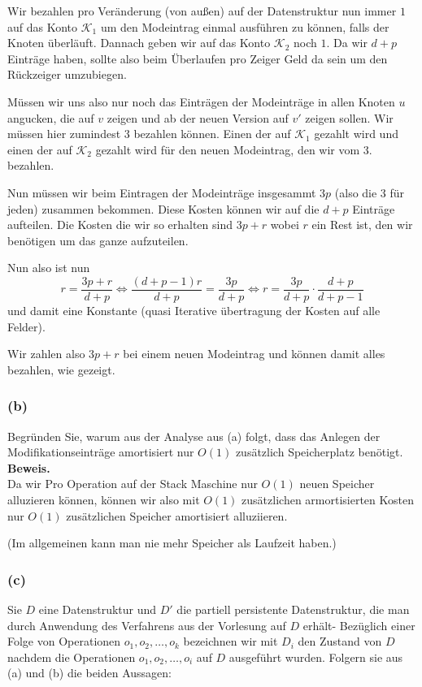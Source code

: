 \documentclass[11pt,a4paper,ngerman]{article}
\begin{document}
Wir bezahlen pro Veränderung (von außen) auf der Datenstruktur nun immer $1$ auf das Konto $\mathcal{K}_1$ um den Modeintrag einmal
ausführen zu können, falls der Knoten überläuft. Dannach geben wir auf das Konto $\mathcal{K}_2$ noch $1$. Da wir $d+p$ Einträge
haben, sollte also beim Überlaufen pro Zeiger Geld da sein um den Rückzeiger umzubiegen.

Müssen wir uns also nur noch das Einträgen der Modeinträge in allen Knoten $u$ angucken, die auf $v$ zeigen und ab der neuen Version auf $v'$ zeigen sollen. Wir müssen hier zumindest $3$ bezahlen können. Einen der auf $\mathcal{K}_1$ gezahlt wird und einen der auf $\mathcal{K}_2$ gezahlt wird
für den neuen Modeintrag, den wir vom $3.$ bezahlen. 

Nun müssen wir beim Eintragen der Modeinträge insgesammt $3p$ (also die 3 für jeden) zusammen bekommen. Diese Kosten können wir
auf die $d+p$ Einträge aufteilen. Die Kosten die wir so erhalten sind $3p+r$ wobei $r$ ein Rest ist, den wir benötigen um das ganze aufzuteilen.

Nun also ist nun
$$
	r = \frac{3p+r}{d+p} \Leftrightarrow \frac{(d+p - 1)r}{d+p} = \frac{3p}{d+p} \Leftrightarrow r = \frac{3p}{d+p} \cdot \frac{d+p}{d+p-1}
$$
und damit eine Konstante (quasi Iterative übertragung der Kosten auf alle Felder).

Wir zahlen also $3p+r$ bei einem neuen Modeintrag und können damit alles bezahlen, wie gezeigt.


\subsubsection*{(b)}
Begründen Sie, warum aus der Analyse aus (a) folgt, dass das Anlegen der Modifikationseinträge amortisiert nur $O(1)$ zusätzlich Speicherplatz benötigt.\\

\noindent\textbf{Beweis.}\\
Da wir Pro Operation auf der Stack Maschine nur $O(1)$ neuen Speicher alluzieren können, können wir also mit $O(1)$ zusätzlichen armortisierten Kosten nur $O(1)$ zusätzlichen Speicher amortisiert alluziieren.

(Im allgemeinen kann man nie mehr Speicher als Laufzeit haben.)

\subsubsection*{(c)}
Sie $D$ eine Datenstruktur und $D'$ die partiell persistente Datenstruktur, die man durch Anwendung des Verfahrens aus der Vorlesung auf $D$ erhält- Bezüglich einer Folge von Operationen $o_1, o_2, \ldots, o_k$ bezeichnen wir mit $D_i$ den Zustand von $D$ nachdem die Operationen $o_1, o_2, \ldots, o_i$ auf $D$ ausgeführt wurden. Folgern sie aus (a) und (b) die beiden Aussagen:
\end{document}
